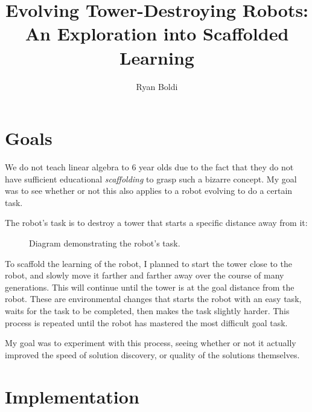 \documentclass[12pt, a4paper]{article}
\title{Evolving Tower-Destroying Robots:\\\normalsize An Exploration into Scaffolded Learning}
\author{Ryan Boldi}
\begin{document}
\maketitle
\tableofcontents

\newpage
\section{Goals}
We do not teach linear algebra to 6 year olds due to the fact that they do not have sufficient educational \emph{scaffolding} to grasp such a bizarre concept. My goal was to see whether or not this also applies to a robot evolving to do a certain task.\par 
The robot's task is to destroy a tower that starts a specific distance away from it:\par
\vspace{-10pt}
\begin{figure}[h]
	
\begin{center}
	\centering
{}
\caption{Diagram demonstrating the robot's task.}
\label{goal}
\end{center}
\end{figure}
\vspace{-10pt}
To scaffold the learning of the robot, I planned to start the tower close to the robot, and slowly move it farther and farther away over the course of many generations. This will continue until the tower is at the goal distance from the robot. These are environmental changes that starts the robot with an easy task, waits for the task to be completed, then makes the task slightly harder. This process is repeated until the robot has mastered the most difficult goal task.\par
My goal was to experiment with this process, seeing whether or not it actually improved the speed of solution discovery, or quality of the solutions themselves.
\newpage

\section{Implementation}
\end{document}
